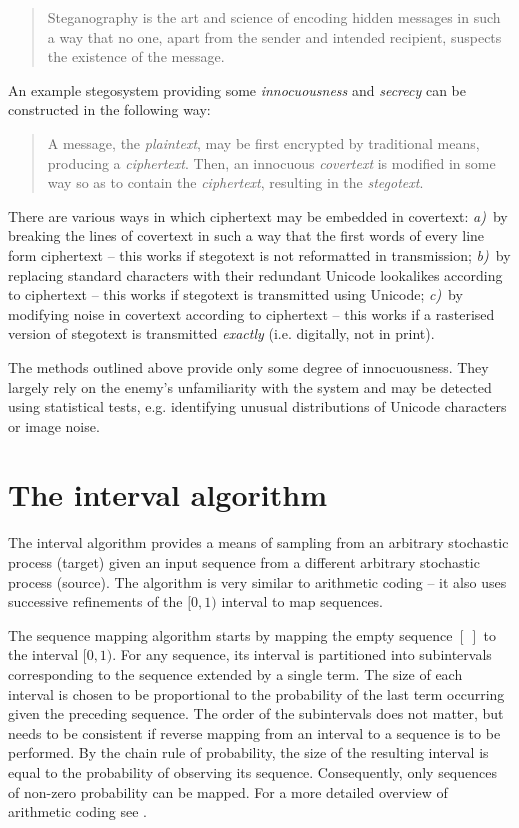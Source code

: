 \documentclass[12pt,twoside,a4paper]{article}
\makeatletter
\newcommand*{\eg}{e.g.\@\xspace}
\newcommand*{\ie}{i.e.\@\xspace}
\makeatother
\begin{document}
\begin{quote} Steganography is the art and science of encoding hidden messages in such a way that no one, apart from the sender and intended recipient, suspects the existence of the message. \cite{wiki:steganography} \end{quote}

An example stegosystem providing some \emph{innocuousness} and \emph{secrecy} can be constructed in the following way:

\begin{quote} A message, the \emph{plaintext}, may be first encrypted by traditional means, producing a \emph{ciphertext}. Then, an innocuous \emph{covertext} is modified in some way so as to contain the \emph{ciphertext}, resulting in the \emph{stegotext}. \cite{wiki:steganography} \end{quote}

There are various ways in which ciphertext may be embedded in covertext:
\emph{a)}~by breaking the lines of covertext in such a way that the first words of every line form ciphertext -- this works if stegotext is not reformatted in transmission;
\emph{b)}~by replacing standard characters with their redundant Unicode lookalikes according to ciphertext  -- this works if stegotext is transmitted using Unicode;
\emph{c)}~by modifying noise in covertext according to ciphertext -- this works if a rasterised version of stegotext is transmitted \emph{exactly} (\ie digitally, not in print).

The methods outlined above provide only some degree of innocuousness. They largely rely on the enemy's unfamiliarity with the system and may be detected using statistical tests, \eg identifying unusual distributions of Unicode characters or image noise.

\section{The interval algorithm}
\label{sec:interval_algorithm}

The interval algorithm \cite{hanhoshi1997} provides a means of sampling from an arbitrary stochastic process (target) given an input sequence from a different arbitrary stochastic process (source). The algorithm is very similar to arithmetic coding -- it also uses successive refinements of the $[0,1)$ interval to map sequences.

The sequence mapping algorithm starts by mapping the empty sequence $[~]$ to the interval $[0,1)$. For any sequence, its interval is partitioned into subintervals corresponding to the sequence extended by a single term. The size of each interval is chosen to be proportional to the probability of the last term occurring given the preceding sequence. The order of the subintervals does not matter, but needs to be consistent if reverse mapping from an interval to a sequence is to be performed. By the chain rule of probability, the size of the resulting interval is equal to the probability of observing its sequence. Consequently, only sequences of non-zero probability can be mapped. For a more detailed overview of arithmetic coding see \cite{coverthomas:sfecoding}.
\end{document}
